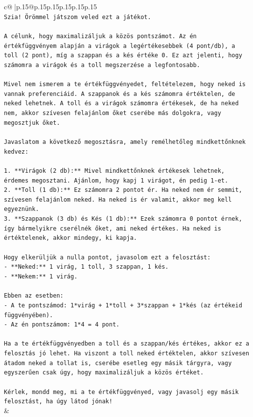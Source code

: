\documentclass{article}
\begin{document}
{\begin{supertabular}{c@{$\;$}|p{.15\linewidth}@{}p{.15\linewidth}p{.15\linewidth}p{.15\linewidth}p{.15\linewidth}p{.15\linewidth}}
{{{\\ 
\texttt{Szia! Örömmel játszom veled ezt a játékot.} \\
\\ 
\texttt{A célunk, hogy maximalizáljuk a közös pontszámot. Az én értékfüggvényem alapján a virágok a legértékesebbek (4 pont/db), a toll (2 pont), míg a szappan és a kés értéke 0. Ez azt jelenti, hogy számomra a virágok és a toll megszerzése a legfontosabb.} \\
\\ 
\texttt{Mivel nem ismerem a te értékfüggvényedet, feltételezem, hogy neked is vannak preferenciáid. A szappanok és a kés számomra értéktelen, de neked lehetnek. A toll és a virágok számomra értékesek, de ha neked nem, akkor szívesen felajánlom őket cserébe más dolgokra, vagy megosztjuk őket.} \\
\\ 
\texttt{Javaslatom a következő megosztásra, amely remélhetőleg mindkettőnknek kedvez:} \\
\\ 
\texttt{1.  **Virágok (2 db):** Mivel mindkettőnknek értékesek lehetnek, érdemes megosztani. Ajánlom, hogy kapj 1 virágot, én pedig 1{-}et.} \\
\texttt{2.  **Toll (1 db):** Ez számomra 2 pontot ér. Ha neked nem ér semmit, szívesen felajánlom neked. Ha neked is ér valamit, akkor meg kell egyeznünk.} \\
\texttt{3.  **Szappanok (3 db) és Kés (1 db):** Ezek számomra 0 pontot érnek, így bármelyikre cserélnék őket, ami neked értékes. Ha neked is értéktelenek, akkor mindegy, ki kapja.} \\
\\ 
\texttt{Hogy elkerüljük a nulla pontot, javasolom ezt a felosztást:} \\
\texttt{{-} **Neked:** 1 virág, 1 toll, 3 szappan, 1 kés.} \\
\texttt{{-} **Nekem:** 1 virág.} \\
\\ 
\texttt{Ebben az esetben:} \\
\texttt{{-} A te pontszámod: 1*virág + 1*toll + 3*szappan + 1*kés (az értékeid függvényében).} \\
\texttt{{-} Az én pontszámom: 1*4 = 4 pont.} \\
\\ 
\texttt{Ha a te értékfüggvényedben a toll és a szappan/kés értékes, akkor ez a felosztás jó lehet. Ha viszont a toll neked értéktelen, akkor szívesen átadom neked a tollat is, cserébe esetleg egy másik tárgyra, vagy egyszerűen csak úgy, hogy maximalizáljuk a közös értéket.} \\
\\ 
\texttt{Kérlek, mondd meg, mi a te értékfüggvényed, vagy javasolj egy másik felosztást, ha úgy látod jónak!} \\
            }
        }
    }
    & \\ \\


\end{supertabular}}
\end{document}
